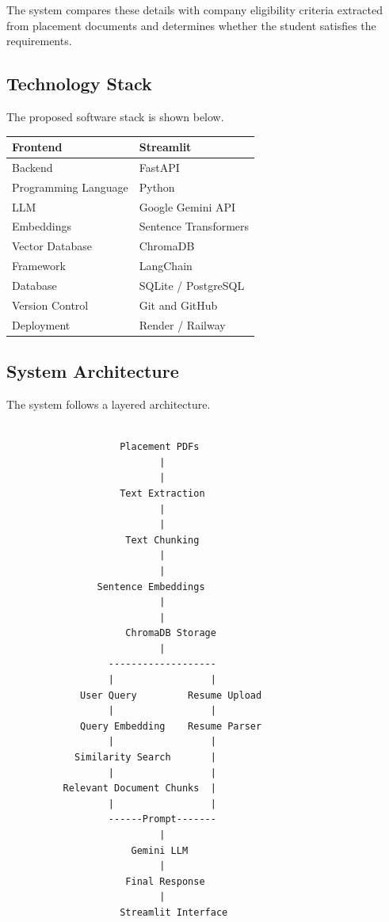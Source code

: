 \documentclass[11pt]{article}
\begin{document}
The system compares these details with company eligibility criteria extracted from placement documents and determines whether the student satisfies the requirements.

\subsection{Technology Stack}

The proposed software stack is shown below.

\begin{center}

\begin{tabular}{|l|l|}
\hline
Frontend & Streamlit \\ \hline
Backend & FastAPI \\ \hline
Programming Language & Python \\ \hline
LLM & Google Gemini API \\ \hline
Embeddings & Sentence Transformers \\ \hline
Vector Database & ChromaDB \\ \hline
Framework & LangChain \\ \hline
Database & SQLite / PostgreSQL \\ \hline
Version Control & Git and GitHub \\ \hline
Deployment & Render / Railway \\ \hline

\end{tabular}

\end{center}

\subsection{System Architecture}

The system follows a layered architecture.

\begin{verbatim}

                    Placement PDFs
                           |
                           |
                    Text Extraction
                           |
                           |
                     Text Chunking
                           |
                           |
                Sentence Embeddings
                           |
                           |
                     ChromaDB Storage
                           |
                  -------------------
                  |                 |
             User Query         Resume Upload
                  |                 |
             Query Embedding    Resume Parser
                  |                 |
            Similarity Search       |
                  |                 |
          Relevant Document Chunks  |
                  |                 |
                  ------Prompt-------
                           |
                      Gemini LLM
                           |
                     Final Response
                           |
                    Streamlit Interface

\end{verbatim}
\end{document}
